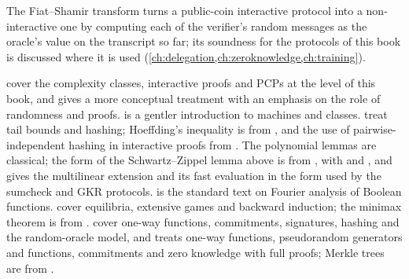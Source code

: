 \begin{refsection}
The Fiat--Shamir transform \parencite{FiatShamir1986} turns a public-coin interactive protocol into a non-interactive one by computing each of the verifier's random messages as the oracle's value on the transcript so far; its soundness for the protocols of this book is discussed where it is used (\cref{ch:delegation,ch:zeroknowledge,ch:training}).

\notesandrefs

\Textcite{AroraBarak2009} cover the complexity classes, interactive proofs and PCPs at the level of this book, and \textcite{Goldreich2008} gives a more conceptual treatment with an emphasis on the role of randomness and proofs. \Textcite{Sipser2013} is a gentler introduction to machines and classes. \Textcite{MitzenmacherUpfal2017} treat tail bounds and hashing; Hoeffding's inequality is from \textcite{Hoeffding1963}, and the use of pairwise-independent hashing in interactive proofs from \textcite{GoldwasserSipser1986}. The polynomial lemmas are classical; the form of the Schwartz--Zippel lemma above is from \textcite{Schwartz1980}, with \textcite{Zippel1979} and \textcite{DeMilloLipton1978}, and \textcite{Thaler2022} gives the multilinear extension and its fast evaluation in the form used by the sumcheck and GKR protocols. \Textcite{ODonnell2014} is the standard text on Fourier analysis of Boolean functions. \Textcite{OsborneRubinstein1994} cover equilibria, extensive games and backward induction; the minimax theorem is from \textcite{vonNeumann1928}. \Textcite{KatzLindell2020} cover one-way functions, commitments, signatures, hashing and the random-oracle model, and \textcite{Goldreich2001} treats one-way functions, pseudorandom generators and functions, commitments and zero knowledge with full proofs; Merkle trees are from \textcite{Merkle1987}.

\printchapterbib
\end{refsection}
